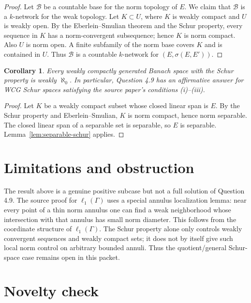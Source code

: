 \documentclass[11pt]{article}
\newtheorem{corollary}{Corollary}
\begin{document}
\begin{proof}
Let \(\mathcal B\) be a countable base for the norm topology of \(E\).  We
claim that \(\mathcal B\) is a \(k\)-network for the weak topology.
Let \(K\subset U\), where \(K\) is weakly compact and \(U\) is weakly open.
By the Eberlein--Smulian theorem and the Schur property, every sequence in
\(K\) has a norm-convergent subsequence; hence \(K\) is norm compact.  Also
\(U\) is norm open.  A finite subfamily of the norm base covers \(K\) and is
contained in \(U\).  Thus \(\mathcal B\) is a countable \(k\)-network for
\((E,\sigma(E,E'))\).
\end{proof}

\begin{corollary}\label{cor:wcg}
Every weakly compactly generated Banach space with the Schur property is
weakly \(\aleph_0\).  In particular, Question 4.9 has an affirmative answer
for WCG Schur spaces satisfying the source paper's conditions (i)--(iii).
\end{corollary}

\begin{proof}
Let \(K\) be a weakly compact subset whose closed linear span is \(E\).  By
the Schur property and Eberlein--Smulian, \(K\) is norm compact, hence norm
separable.  The closed linear span of a separable set is separable, so \(E\)
is separable.  Lemma~\ref{lem:separable-schur} applies.
\end{proof}

\section*{Limitations and obstruction}

The result above is a genuine positive subcase but not a full solution of
Question 4.9.  The source proof for \(\ell_1(\Gamma)\) uses a special annulus
localization lemma: near every point of a thin norm annulus one can find a
weak neighborhood whose intersection with that annulus has small norm
diameter.  This follows from the coordinate structure of \(\ell_1(\Gamma)\).
The Schur property alone only controls weakly convergent sequences and weakly
compact sets; it does not by itself give such local norm control on arbitrary
bounded annuli.  Thus the quotient/general Schur-space case remains open in
this packet.

\section*{Novelty check}
\end{document}
